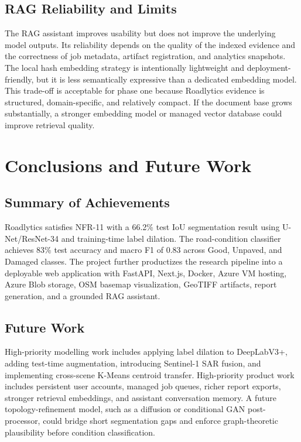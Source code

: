 ﻿\documentclass[conference]{IEEEtran}
\begin{document}
\subsection{RAG Reliability and Limits}
The RAG assistant improves usability but does not improve the underlying model outputs. Its reliability depends on the quality of the indexed evidence and the correctness of job metadata, artifact registration, and analytics snapshots. The local hash embedding strategy is intentionally lightweight and deployment-friendly, but it is less semantically expressive than a dedicated embedding model. This trade-off is acceptable for phase one because Roadlytics evidence is structured, domain-specific, and relatively compact. If the document base grows substantially, a stronger embedding model or managed vector database could improve retrieval quality.

\section{Conclusions and Future Work}
\subsection{Summary of Achievements}
Roadlytics satisfies NFR-11 with a 66.2\% test IoU segmentation result using U-Net/ResNet-34 and training-time label dilation. The road-condition classifier achieves 83\% test accuracy and macro F1 of 0.83 across Good, Unpaved, and Damaged classes. The project further productizes the research pipeline into a deployable web application with FastAPI, Next.js, Docker, Azure VM hosting, Azure Blob storage, OSM basemap visualization, GeoTIFF artifacts, report generation, and a grounded RAG assistant.

\subsection{Future Work}
High-priority modelling work includes applying label dilation to DeepLabV3+, adding test-time augmentation, introducing Sentinel-1 SAR fusion, and implementing cross-scene K-Means centroid transfer. High-priority product work includes persistent user accounts, managed job queues, richer report exports, stronger retrieval embeddings, and assistant conversation memory. A future topology-refinement model, such as a diffusion or conditional GAN post-processor, could bridge short segmentation gaps and enforce graph-theoretic plausibility before condition classification.
\end{document}
